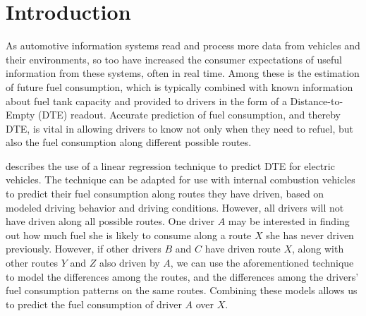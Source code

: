 \section{Introduction} \label{sec:intro}

As automotive information systems read and process more data from vehicles and their environments, so too have increased the consumer expectations of useful information from these systems, often in real time. Among these is the estimation of future fuel consumption, which is typically combined with known information about fuel tank capacity and provided to drivers in the form of a Distance-to-Empty (DTE) readout. Accurate prediction of fuel consumption, and thereby DTE, is vital in allowing drivers to know not only when they need to refuel, but also the fuel consumption along different possible routes.

\cite{rodgersetal2013} describes the use of a linear regression technique to predict DTE for electric vehicles. The technique can be adapted for use with internal combustion vehicles to predict their fuel consumption along routes they have driven, based on modeled driving behavior and driving conditions. However, all drivers will not have driven along all possible routes. One driver \(A\) may be interested in finding out how much fuel she is likely to consume along a route \(X\) she has never driven previously. However, if other drivers \(B\) and \(C\) have driven route \(X\), along with other routes \(Y\) and \(Z\) also driven by \(A\), we can use the aforementioned technique to model the differences among the routes, and the differences among the drivers' fuel consumption patterns on the same routes. Combining these models allows us to predict the fuel consumption of driver \(A\) over \(X\).

